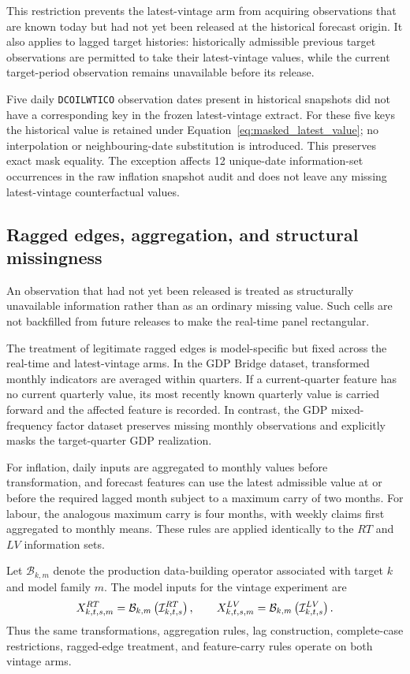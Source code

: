 This restriction prevents the latest-vintage arm from acquiring observations
that are known today but had not yet been released at the historical forecast
origin. It also applies to lagged target histories: historically admissible
previous target observations are permitted to take their latest-vintage
values, while the current target-period observation remains unavailable
before its release.

Five daily \texttt{DCOILWTICO} observation dates present in historical
snapshots did not have a corresponding key in the frozen latest-vintage
extract. For these five keys the historical value is retained under
Equation~\eqref{eq:masked_latest_value}; no interpolation or neighbouring-date
substitution is introduced. This preserves exact mask equality. The exception
affects 12 unique-date information-set occurrences in the raw inflation
snapshot audit and does not leave any missing latest-vintage counterfactual
values.

\subsection{Ragged edges, aggregation, and structural missingness}
\label{subsec:ragged_edges}

An observation that had not yet been released is treated as structurally
unavailable information rather than as an ordinary missing value. Such cells
are not backfilled from future releases to make the real-time panel
rectangular.

The treatment of legitimate ragged edges is model-specific but fixed across
the real-time and latest-vintage arms. In the GDP Bridge dataset, transformed
monthly indicators are averaged within quarters. If a current-quarter feature
has no current quarterly value, its most recently known quarterly value is
carried forward and the affected feature is recorded. In contrast, the GDP
mixed-frequency factor dataset preserves missing monthly observations and
explicitly masks the target-quarter GDP realization.

For inflation, daily inputs are aggregated to monthly values before
transformation, and forecast features can use the latest admissible value at
or before the required lagged month subject to a maximum carry of two months.
For labour, the analogous maximum carry is four months, with weekly claims
first aggregated to monthly means. These rules are applied identically to the
$RT$ and $LV$ information sets.

Let $\mathcal{B}_{k,m}$ denote the production data-building operator associated
with target $k$ and model family $m$. The model inputs for the vintage
experiment are
\begin{equation}
    X^{RT}_{k,t,s,m}
    =
    \mathcal{B}_{k,m}
    \left(
        \mathcal{I}^{RT}_{k,t,s}
    \right),
    \qquad
    X^{LV}_{k,t,s,m}
    =
    \mathcal{B}_{k,m}
    \left(
        \mathcal{I}^{LV}_{k,t,s}
    \right).
    \label{eq:production_builders}
\end{equation}
Thus the same transformations, aggregation rules, lag construction,
complete-case restrictions, ragged-edge treatment, and feature-carry rules
operate on both vintage arms.


